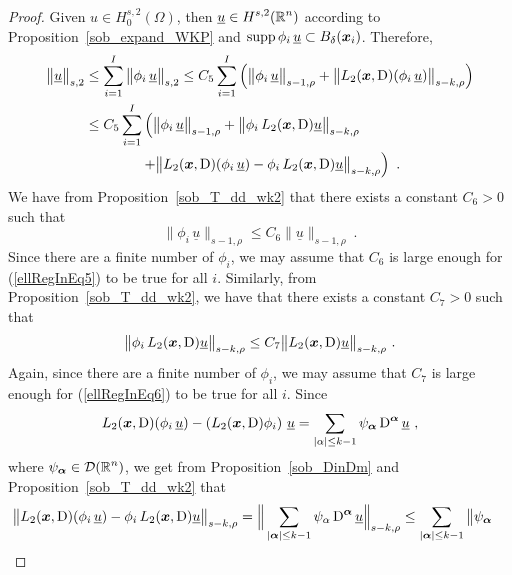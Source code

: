 \begin{proof}
Given $\displaystyle u \in H^{s,2}_0(\Omega)$, then
$\displaystyle \underline{u} \in H^{s,2}(\mathbb{R}^n)$ according to
Proposition~\ref{sob_expand_WKP}
and $\operatorname{supp} \phi_i\,\underline{u} \subset B_\delta({\bm{x}}_i)$.  Therefore,
\begin{align}
\big\|\underline{u}\big\|_{s,2}
& \leq \sum_{i=1}^I \big\|\phi_i\,\underline{u}\big\|_{s,2}
\leq C_5 \sum_{i=1}^I \left( \big\|\phi_i\,\underline{u}\big\|_{s-1,\rho} +
\big\|L_2({\bm{x}},\operatorname{D})(\phi_i\,\underline{u})\big\|_{s-k,\rho} \right)
\nonumber \\
&\leq C_5 \sum_{i=1}^I \left( \big\|\phi_i\,\underline{u}\big\|_{s-1,\rho}
+ \big\|\phi_i \, L_2({\bm{x}},\operatorname{D})\underline{u} \big\|_{s-k,\rho}
\right. \nonumber \\
&\qquad \qquad \left. + \big\|L_2({\bm{x}},\operatorname{D})(\phi_i\,\underline{u})
- \phi_i\, L_2({\bm{x}},\operatorname{D})\underline{u} \big\|_{s-k,\rho} \right) \ .
\label{ellRegInEq4}
\end{align}
We have from Proposition~\ref{sob_T_dd_wk2} that there exists
a constant $C_6>0$ such that
\begin{equation} \label{ellRegInEq5}
\big\|\phi_i\,\underline{u}\big\|_{s-1,\rho}
\leq C_6 \big\|\underline{u}\big\|_{s-1,\rho} \ .
\end{equation}
Since there are a finite number of $\phi_i$, we may assume that $C_6$
is large enough for (\ref{ellRegInEq5}) to be true for all $i$.
Similarly, from Proposition~\ref{sob_T_dd_wk2}, we have that there exists
a constant $C_7>0$ such that
\begin{equation} \label{ellRegInEq6}
\big\|\phi_i\, L_2(\VEC{x},\diff)\underline{u}\big\|_{s-k,\rho}
\leq C_7 \big\|L_2(\VEC{x},\diff)\underline{u}\big\|_{s-k,\rho} \ .
\end{equation}
Again, since there are a finite number of $\phi_i$, we may assume that $C_7$
is large enough for (\ref{ellRegInEq6}) to be true for all $i$.
Since
\[
L_2({\bm{x}},\operatorname{D})(\phi_i\,\underline{u})
- \left(L_2({\bm{x}},\operatorname{D})\phi_i\right) \,\underline{u}
= \sum_{|\alpha|\leq k-1} \psi_{{\bm{\alpha}}} \operatorname{D}^{{\bm{\alpha}}} \underline{u} \ ,
\]
where $\displaystyle \psi_{{\bm{\alpha}}} \in \mathcal{D}(\mathbb{R}^n)$, we get from
Proposition~\ref{sob_DinDm} and Proposition~\ref{sob_T_dd_wk2} that
\begin{align}
&\big\|L_2(\VEC{x},\diff)(\phi_i\,\underline{u})
- \phi_i\, L_2(\VEC{x},\diff)\underline{u} \big\|_{s-k,\rho}
= \Big\| \sum_{|\VEC{\alpha}|\leq k-1} \psi_{\alpha}
\diff^{\VEC{\alpha}} \underline{u} \Big\|_{s-k,\rho}
\leq \sum_{|\VEC{\alpha}|\leq k-1} \big\| \psi_{\VEC{\alpha}}

\end{align}
\end{proof}
